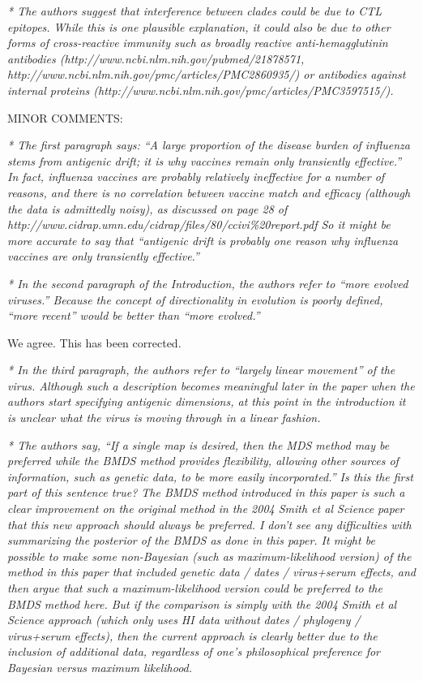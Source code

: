 \documentclass[11pt,oneside,letterpaper]{article}
\begin{document}
\textsl{* The authors suggest that interference between clades could be due to CTL epitopes. While this is one plausible explanation, it could also be due to other forms of cross-reactive immunity such as broadly reactive anti-hemagglutinin antibodies (http://www.ncbi.nlm.nih.gov/pubmed/21878571, http://www.ncbi.nlm.nih.gov/pmc/articles/PMC2860935/) or antibodies against internal proteins (http://www.ncbi.nlm.nih.gov/pmc/articles/PMC3597515/).}

MINOR COMMENTS: 

\textsl{* The first paragraph says: ``A large proportion of the disease burden of influenza stems from antigenic drift; it is why vaccines remain only transiently effective.'' In fact, influenza vaccines are probably relatively ineffective for a number of reasons, and there is no correlation between vaccine match and efficacy (although the data is admittedly noisy), as discussed on page 28 of http://www.cidrap.umn.edu/cidrap/files/80/ccivi\%20report.pdf So it might be more accurate to say that ``antigenic drift is probably one reason why influenza vaccines are only transiently effective.''}

\textsl{* In the second paragraph of the Introduction, the authors refer to ``more evolved viruses.'' Because the concept of directionality in evolution is poorly defined, ``more recent'' would be better than ``more evolved.''}

We agree. This has been corrected.

\textsl{* In the third paragraph, the authors refer to ``largely linear movement'' of the virus. Although such a description becomes meaningful later in the paper when the authors start specifying antigenic dimensions, at this point in the introduction it is unclear what the virus is moving through in a linear fashion.}

\textsl{* The authors say, ``If a single map is desired, then the MDS method may be preferred while the BMDS method provides flexibility, allowing other sources of information, such as genetic data, to be more easily incorporated.'' Is this the first part of this sentence true? The BMDS method introduced in this paper is such a clear improvement on the original method in the 2004 Smith et al Science paper that this new approach should always be preferred. I don't see any difficulties with summarizing the posterior of the BMDS as done in this paper. It might be possible to make some non-Bayesian (such as maximum-likelihood version) of the method in this paper that included genetic data / dates / virus+serum effects, and then argue that such a maximum-likelihood version could be preferred to the BMDS method here. But if the comparison is simply with the 2004 Smith et al Science approach (which only uses HI data without dates / phylogeny / virus+serum effects), then the current approach is clearly better due to the inclusion of additional data, regardless of one's philosophical preference for Bayesian versus maximum likelihood.}
\end{document}
